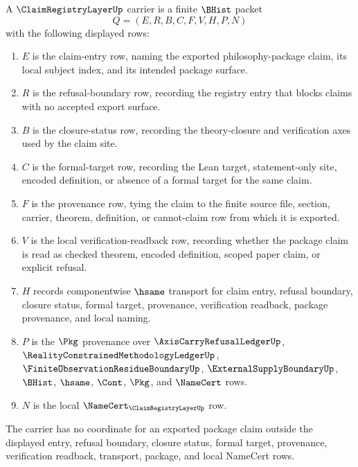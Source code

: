 \begin{definition}
\label{def:claim-registry-layer-carrier}
A $\ClaimRegistryLayerUp$ carrier is a finite $\BHist$ packet
$$
Q=(E,R,B,C,F,V,H,P,N)
$$
with the following displayed rows:
\begin{enumerate}
\item $E$ is the claim-entry row, naming the exported philosophy-package claim, its local subject index, and its intended package surface.
\item $R$ is the refusal-boundary row, recording the registry entry that blocks claims with no accepted export surface.
\item $B$ is the closure-status row, recording the theory-closure and verification axes used by the claim site.
\item $C$ is the formal-target row, recording the Lean target, statement-only site, encoded definition, or absence of a formal target for the same claim.
\item $F$ is the provenance row, tying the claim to the finite source file, section, carrier, theorem, definition, or cannot-claim row from which it is exported.
\item $V$ is the local verification-readback row, recording whether the package claim is read as checked theorem, encoded definition, scoped paper claim, or explicit refusal.
\item $H$ records componentwise $\hsame$ transport for claim entry, refusal boundary, closure status, formal target, provenance, verification readback, package provenance, and local naming.
\item $P$ is the $\Pkg$ provenance over $\AxisCarryRefusalLedgerUp$, $\RealityConstrainedMethodologyLedgerUp$, $\FiniteObservationResidueBoundaryUp$, $\ExternalSupplyBoundaryUp$, $\BHist$, $\hsame$, $\Cont$, $\Pkg$, and $\NameCert$ rows.
\item $N$ is the local $\NameCert_{\ClaimRegistryLayerUp}$ row.
\end{enumerate}
The carrier has no coordinate for an exported package claim outside the displayed entry, refusal boundary, closure status, formal target, provenance, verification readback, transport, package, and local NameCert rows.
\end{definition}

